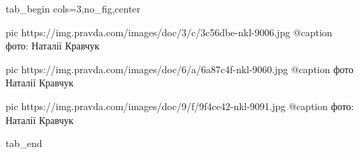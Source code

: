  
 
 
 
 


\ifcmt
  tab_begin cols=3,no_fig,center

     pic https://img.pravda.com/images/doc/3/c/3c56dbe-nkl-9006.jpg
		 @caption фото: Наталії Кравчук

		 pic https://img.pravda.com/images/doc/6/a/6a87c4f-nkl-9060.jpg
		 @caption фото Наталії Кравчук

		 pic https://img.pravda.com/images/doc/9/f/9f4ce42-nkl-9091.jpg
		 @caption фото: Наталії Кравчук

  tab_end
\fi
